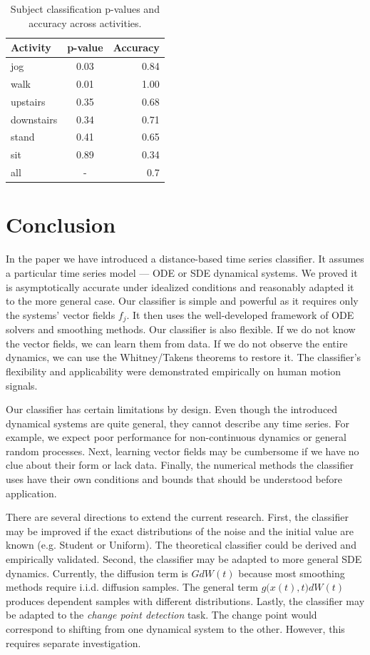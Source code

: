 \documentclass[referee, pdflatex, sn-mathphys-num]{sn-jnl}
\theoremstyle{definition}
\theoremstyle{plain}
\begin{document}
	\begin{table}[h]
		\centering
		\caption{Subject classification p-values and accuracy across activities.}\label{tab:ind_hyp_res}
		\begin{tabular}{lcr}
			\toprule
			Activity & p-value & Accuracy \\
			\midrule
			jog & 0.03 & 0.84 \\
			walk & 0.01& 1.00\\
			upstairs & 0.35 & 0.68 \\
			downstairs & 0.34 & 0.71 \\
			stand & 0.41 & 0.65 \\
			sit & 0.89 & 0.34 \\
			all & - & 0.7 \\
			\bottomrule
		\end{tabular}
	\end{table}
	
	\section{Conclusion}
	
	In the paper we have introduced a distance-based time series classifier. It assumes a particular time series model --- ODE or SDE dynamical systems. We proved it is asymptotically accurate under idealized conditions and reasonably adapted it to the more general case.	Our classifier is simple and powerful as it requires only the systems' vector fields $f_j$. It then uses the well-developed framework of ODE solvers and smoothing methods. Our classifier is also flexible. If we do not know the vector fields, we can learn them from data. If we do not observe the entire dynamics, we can use the Whitney/Takens theorems to restore it. The classifier's flexibility and applicability were demonstrated empirically on human motion signals.%
	
	Our classifier has certain limitations by design. Even though the introduced dynamical systems are quite general, they cannot describe any time series. For example, we expect poor performance for non-continuous dynamics or general random processes. Next, learning vector fields may be cumbersome if we have no clue about their form or lack data. Finally, the numerical methods the classifier uses have their own conditions and bounds that should be understood before application.
	
	There are several directions to extend the current research. First, the classifier may be improved if the exact distributions of the noise and the initial value are known (e.g. Student or Uniform). The theoretical classifier could be derived and empirically validated. Second, the classifier may be adapted to more general SDE dynamics. Currently, the diffusion term is $G dW(t)$ because most smoothing methods require i.i.d. diffusion samples. The general term $g \big(x(t), t \big) dW(t)$ produces dependent samples with different distributions. Lastly, the classifier may be adapted to the \emph{change point detection} task. The change point would correspond to shifting from one dynamical system to the other. However, this requires separate investigation.
	
\end{document}
